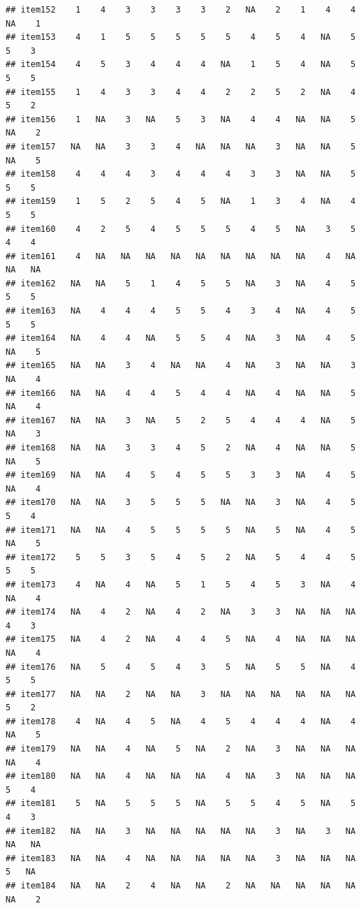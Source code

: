 \documentclass[
  man]{apa6}
\begin{document}
\begin{verbatim}
## item152    1    4    3    3    3    3    2   NA    2    1    4    4   NA    1
## item153    4    1    5    5    5    5    5    4    5    4   NA    5    5    3
## item154    4    5    3    4    4    4   NA    1    5    4   NA    5    5    5
## item155    1    4    3    3    4    4    2    2    5    2   NA    4    5    2
## item156    1   NA    3   NA    5    3   NA    4    4   NA   NA    5   NA    2
## item157   NA   NA    3    3    4   NA   NA   NA    3   NA   NA    5   NA    5
## item158    4    4    4    3    4    4    4    3    3   NA   NA    5    5    5
## item159    1    5    2    5    4    5   NA    1    3    4   NA    4    5    5
## item160    4    2    5    4    5    5    5    4    5   NA    3    5    4    4
## item161    4   NA   NA   NA   NA   NA   NA   NA   NA   NA    4   NA   NA   NA
## item162   NA   NA    5    1    4    5    5   NA    3   NA    4    5    5    5
## item163   NA    4    4    4    5    5    4    3    4   NA    4    5    5    5
## item164   NA    4    4   NA    5    5    4   NA    3   NA    4    5   NA    5
## item165   NA   NA    3    4   NA   NA    4   NA    3   NA   NA    3   NA    4
## item166   NA   NA    4    4    5    4    4   NA    4   NA   NA    5   NA    4
## item167   NA   NA    3   NA    5    2    5    4    4    4   NA    5   NA    3
## item168   NA   NA    3    3    4    5    2   NA    4   NA   NA    5   NA    5
## item169   NA   NA    4    5    4    5    5    3    3   NA    4    5   NA    4
## item170   NA   NA    3    5    5    5   NA   NA    3   NA    4    5    5    4
## item171   NA   NA    4    5    5    5    5   NA    5   NA    4    5   NA    5
## item172    5    5    3    5    4    5    2   NA    5    4    4    5    5    5
## item173    4   NA    4   NA    5    1    5    4    5    3   NA    4   NA    4
## item174   NA    4    2   NA    4    2   NA    3    3   NA   NA   NA    4    3
## item175   NA    4    2   NA    4    4    5   NA    4   NA   NA   NA   NA    4
## item176   NA    5    4    5    4    3    5   NA    5    5   NA    4    5    5
## item177   NA   NA    2   NA   NA    3   NA   NA   NA   NA   NA   NA    5    2
## item178    4   NA    4    5   NA    4    5    4    4    4   NA    4   NA    5
## item179   NA   NA    4   NA    5   NA    2   NA    3   NA   NA   NA   NA    4
## item180   NA   NA    4   NA   NA   NA    4   NA    3   NA   NA   NA    5    4
## item181    5   NA    5    5    5   NA    5    5    4    5   NA    5    4    3
## item182   NA   NA    3   NA   NA   NA   NA   NA    3   NA    3   NA   NA   NA
## item183   NA   NA    4   NA   NA   NA   NA   NA    3   NA   NA   NA    5   NA
## item184   NA   NA    2    4   NA   NA    2   NA   NA   NA   NA   NA   NA    2

\end{verbatim}
\end{document}

